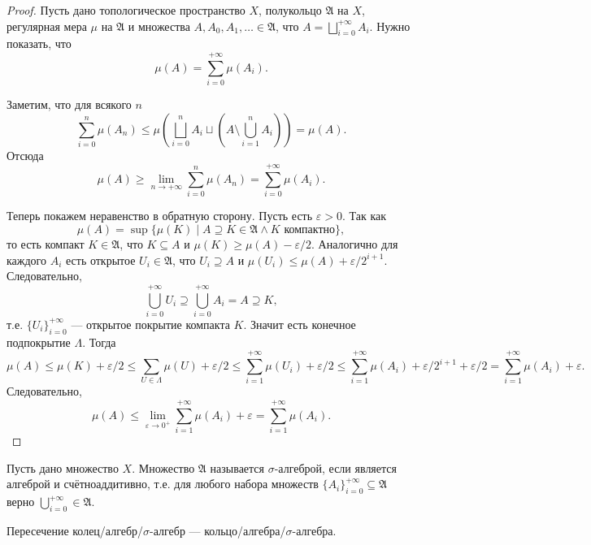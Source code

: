\documentclass[12pt,a4paper]{article}
\begin{document}
    \begin{proof}
        Пусть дано топологическое пространство $X$, полукольцо $\mathfrak{A}$ на $X$, регулярная мера $\mu$ на $\mathfrak{A}$ и множества $A, A_0, A_1, \dots \in \mathfrak{A}$, что $A = \bigsqcup_{i=0}^{+\infty} A_i$. Нужно показать, что
        \[\mu(A) = \sum_{i=0}^{+\infty} \mu(A_i).\]
        
        Заметим, что для всякого $n$
        \[\sum_{i=0}^n \mu(A_n) \leqslant \mu\left(\bigsqcup_{i=0}^n A_i \sqcup \left(A \setminus \bigcup_{i=1}^n A_i\right)\right) = \mu(A).\]
        Отсюда
        \[\mu(A) \geqslant \lim_{n \to +\infty} \sum_{i=0}^n \mu(A_n) = \sum_{i=0}^{+\infty} \mu(A_i).\]

        Теперь покажем неравенство в обратную сторону. Пусть есть $\varepsilon > 0$. Так как
        \[\mu(A) = \sup \{\mu(K) \mid A \supseteq K \in \mathfrak{A} \wedge K \text{ компактно}\},\]
        то есть компакт $K \in \mathfrak{A}$, что $K \subseteq A$ и $\mu(K) \geqslant \mu(A) - \varepsilon/2$. Аналогично для каждого $A_i$ есть открытое $U_i \in \mathfrak{A}$, что $U_i \supseteq A$ и $\mu(U_i) \leqslant \mu(A) + \varepsilon/2^{i+1}$. Следовательно,
        \[\bigcup_{i=0}^{+\infty} U_i \supseteq \bigcup_{i=0}^{+\infty} A_i = A \supseteq K,\]
        т.е. $\{U_i\}_{i=0}^{+\infty}$ --- открытое покрытие компакта $K$. Значит есть конечное подпокрытие $\Lambda$. Тогда
        \[
            \mu(A)
            \leqslant \mu(K) + \varepsilon/2
            \leqslant \sum_{U \in \Lambda} \mu(U) + \varepsilon/2
            \leqslant \sum_{i=1}^{+\infty} \mu(U_i) + \varepsilon/2
            \leqslant \sum_{i=1}^{+\infty} \mu(A_i) + \varepsilon/2^{i+1} + \varepsilon/2
            = \sum_{i=1}^{+\infty} \mu(A_i) + \varepsilon.
        \]
        Следовательно,
        \[\mu(A) \leqslant \lim_{\varepsilon \to 0^+} \sum_{i=1}^{+\infty} \mu(A_i) + \varepsilon = \sum_{i=1}^{+\infty} \mu(A_i).\]
    \end{proof}

    \begin{definition}
        Пусть дано множество $X$. Множество $\mathfrak{A}$ называется $\sigma$-алгеброй, если является алгеброй и счётноаддитивно, т.е. для любого набора множеств $\{A_i\}_{i=0}^{+\infty} \subseteq \mathfrak{A}$ верно $\bigcup_{i=0}^{+\infty} \in \mathfrak{A}$.
    \end{definition}

    \begin{lemma}
        Пересечение колец/алгебр/$\sigma$-алгебр --- кольцо/алгебра/$\sigma$-алгебра.
    \end{lemma}
\end{document}
